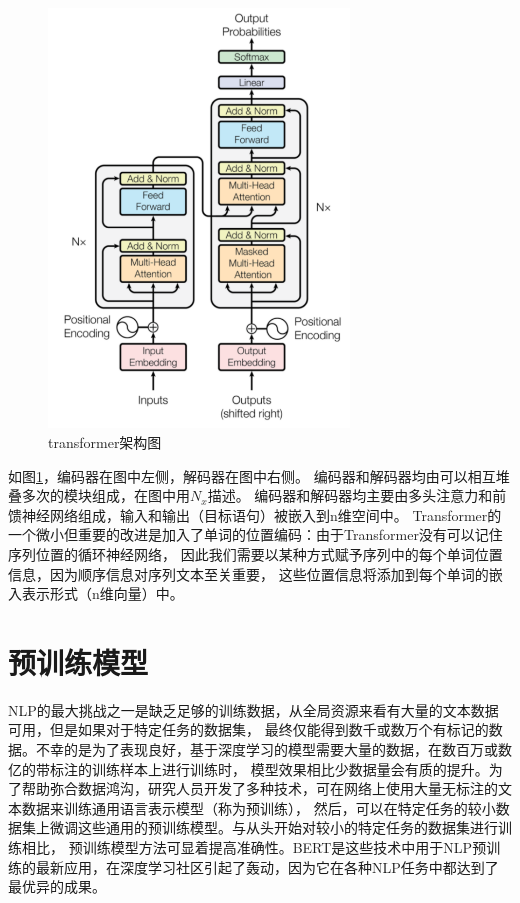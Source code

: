 \begin{figure}[htbp]
  \centering
  \includegraphics[width=8cm]{./images/transformer.png}
  \caption{transformer架构图\cite{vaswani2017attention}}
  \label{fig:transformer}
\end{figure}

如图\ref{fig:transformer}，编码器在图中左侧，解码器在图中右侧。 
编码器和解码器均由可以相互堆叠多次的模块组成，在图中用$N_x$描述。 
编码器和解码器均主要由多头注意力和前馈神经网络组成，输入和输出（目标语句）被嵌入到n维空间中。
Transformer的一个微小但重要的改进是加入了单词的位置编码：由于Transformer没有可以记住序列位置的循环神经网络，
因此我们需要以某种方式赋予序列中的每个单词位置信息，因为顺序信息对序列文本至关重要，
这些位置信息将添加到每个单词的嵌入表示形式（n维向量）中。

\section{预训练模型}
NLP的最大挑战之一是缺乏足够的训练数据，从全局资源来看有大量的文本数据可用，但是如果对于特定任务的数据集，
最终仅能得到数千或数万个有标记的数据。不幸的是为了表现良好，基于深度学习的模型需要大量的数据，在数百万或数亿的带标注的训练样本上进行训练时，
模型效果相比少数据量会有质的提升。为了帮助弥合数据鸿沟，研究人员开发了多种技术，可在网络上使用大量无标注的文本数据来训练通用语言表示模型（称为预训练），
然后，可以在特定任务的较小数据集上微调这些通用的预训练模型。与从头开始对较小的特定任务的数据集进行训练相比，
预训练模型方法可显着提高准确性。BERT\cite{devlin2018bert}是这些技术中用于NLP预训练的最新应用，在深度学习社区引起了轰动，因为它在各种NLP任务中都达到了最优异的成果。

